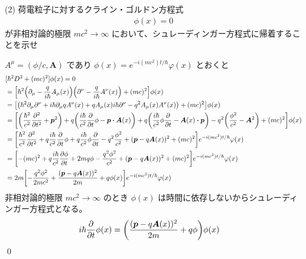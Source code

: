 \documentclass[uplatex,dvipdfmx,a4paper,11pt]{jlreq}
\makeatletter
\newcommand{\pp}{\bm{p}}
\theoremstyle{definition}
\renewenvironment{proof}[1][\proofname]{\par
  \normalfont
  \topsep6\p@\@plus6\p@ \trivlist
  \item[\hskip\labelsep{\bfseries #1}\@addpunct{\bfseries}]\ignorespaces\quad\par
}{%
  \qed\endtrivlist\@endpefalse
}
\renewcommand\proofname{証明}
\makeatother
\begin{document}
(2) 荷電粒子に対するクライン・ゴルドン方程式
\begin{align}
  [\hbar^2D^2 + (mc)^2]\phi(x) = 0
\end{align}
が非相対論的極限 $mc^2\to\infty$ において、シュレーディンガー方程式に帰着することを示せ
\begin{proof}
  $A^\mu = (\phi/c, \bm{A})$ であり $\phi(x) = e^{-i(mc^2)t/\hbar}\varphi(x)$ とおくと
  \begin{align}
     & [\hbar^2D^2 + (mc)^2]\phi(x) = 0                                                                                                                                                                                                   \\
     & = \qty[\hbar^2\qty(\partial_\mu - \frac{q}{i\hbar}A_\mu(x))\qty(\partial^\nu - \frac{q}{i\hbar}A^\nu(x)) + (mc)^2]\phi(x)                                                                                                          \\
     & = \qty[\qty(\hbar^2\partial_\mu\partial^\nu + i\hbar\partial_\mu qA^\nu(x)  + qA_\mu(x)i\hbar\partial^\nu - q^2A_\mu(x)A^\nu(x)) + (mc)^2]\phi(x)                                                                                  \\
     & = \qty[\qty(\frac{\hbar^2}{c^2}\pdv[2]{t} + \pp^2) + q\qty(\frac{i\hbar}{c^2}\pdv{t}\phi - \pp\vdot\bm{A}(x)) + q\qty(\frac{i\hbar}{c^2}\phi\pdv{t} - \bm{A}(x)\vdot\pp) - q^2\qty(\frac{\phi^2}{c^2} - \bm{A}^2) + (mc)^2]\phi(x) \\
     & = \qty[\frac{\hbar^2}{c^2}\pdv[2]{t} + q\frac{i\hbar}{c^2}\pdv{t}\phi + q\frac{i\hbar}{c^2}\phi\pdv{t} - q^2\frac{\phi^2}{c^2} + (\pp - q\bm{A}(x))^2 + (mc)^2]e^{-i(mc^2)t/\hbar}\varphi(x)                                       \\
     & = \qty[-(mc)^2 + q\frac{i\hbar}{c^2}\pdv{\phi}{t} + 2mq\phi - \frac{q^2\phi^2}{c^2} + (\pp - q\bm{A}(x))^2 + (mc)^2]e^{-i(mc^2)t/\hbar}\varphi(x)                                                                                  \\
     & = 2m\qty[-\frac{q^2\phi^2}{2mc^2} + \frac{(\pp - q\bm{A}(x))^2}{2m} + q\phi(x)]e^{-i(mc^2)t/\hbar}\varphi(x)
  \end{align}
  非相対論的極限 $mc^2\to\infty$ のとき $\phi(x)$ は時間に依存しないからシュレーディンガー方程式となる。
  \begin{align}
    i\hbar\pdv{t}\phi(x) & = \qty(\frac{(\pp - q\bm{A}(x))^2}{2m} + q\phi)\phi(x)
  \end{align}
\end{proof}
\end{document}
